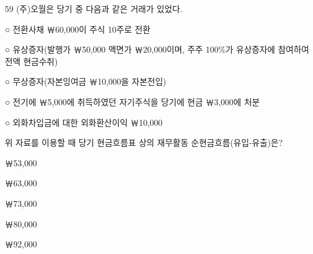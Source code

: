 \begin{question}{59}
(주)오월은 당기 중 다음과 같은 거래가 있었다.
\begin{framedtext}
○ 전환사채 ￦60,000이 주식 10주로 전환 \par
○ 유상증자(발행가 ￦50,000 액면가 ￦20,000이며, 주주 100\%가 유상증자에 참여하여 전액 현금수취) \par
○ 무상증자(자본잉여금 ￦10,000을 자본전입) \par
○ 전기에 ￦5,000에 취득하였던 자기주식을 당기에 현금 ￦3,000에 처분 \par
○ 외화차입금에 대한 외화환산이익 ￦10,000 \par
\end{framedtext}
위 자료를 이용할 때 당기 현금흐름표 상의 재무활동 순현금흐름(유입-유출)은?
\begin{choices}
  \item ￦53,000
  \item ￦63,000
  \item ￦73,000
  \item ￦80,000
  \item ￦92,000
\end{choices}
\end{question}
